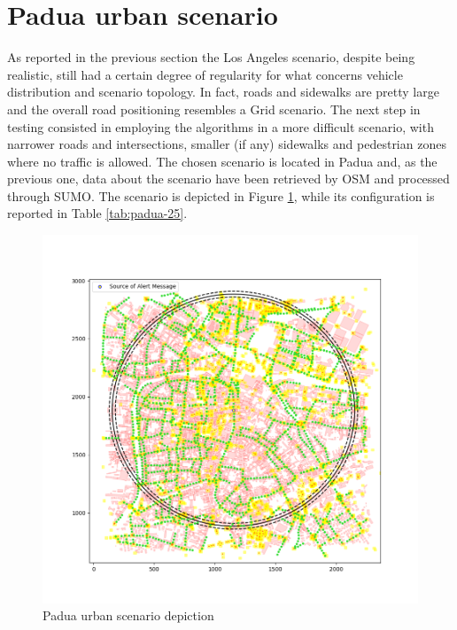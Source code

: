 	\section{Padua urban scenario}
		As reported in the previous section the Los Angeles scenario, despite being realistic, still had a certain degree of regularity for what concerns vehicle distribution and scenario topology. In fact, roads and sidewalks are pretty large and the overall road positioning resembles a Grid scenario. The next step in testing consisted in employing the algorithms in a more difficult scenario, with narrower roads and intersections, smaller (if any) sidewalks and pedestrian zones where no traffic is allowed. The chosen scenario is located in Padua and, as the previous one, data about the scenario have been retrieved by OSM and processed through SUMO. The scenario is depicted in Figure \ref{fig:padua-scenario}, while its configuration is reported in Table \ref{tab:padua-25}. 
	
		\begin{figure}[H]
			\centering
			\includegraphics[width=1.0\textwidth]{immagini/padua-25/padua-scenario}
			\caption{Padua urban scenario depiction}
			\label{fig:padua-scenario}
		\end{figure}
	
